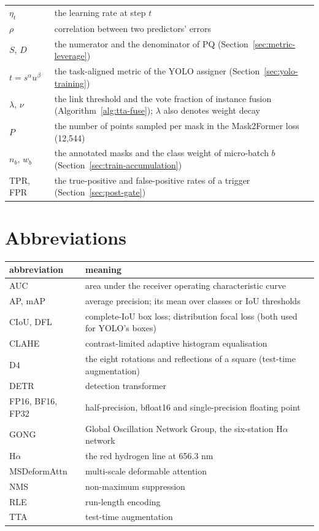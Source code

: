 {\begin{longtable}{@{}p{3.0cm}p{9.3cm}@{}}
$\eta_t$ & the learning rate at step $t$ \\
$\rho$ & correlation between two predictors' errors \\
$S$, $D$ & the numerator and the denominator of PQ (Section~\ref{sec:metric-leverage}) \\
$t=s^{\alpha}u^{\beta}$ & the task-aligned metric of the YOLO assigner (Section~\ref{sec:yolo-training}) \\
$\lambda$, $\nu$ & the link threshold and the vote fraction of instance fusion (Algorithm~\ref{alg:tta-fuse}); $\lambda$ also denotes weight decay \\
$P$ & the number of points sampled per mask in the Mask2Former loss (12,544) \\
$n_b$, $w_b$ & the annotated masks and the class weight of micro-batch $b$ (Section~\ref{sec:train-accumulation}) \\
TPR, FPR & the true-positive and false-positive rates of a trigger (Section~\ref{sec:post-gate}) \\
\end{longtable}
}

\section{Abbreviations}
{\small
\begin{longtable}{@{}p{3.0cm}p{9.3cm}@{}}
\toprule
abbreviation & meaning \\
\midrule
\endfirsthead
\bottomrule
\endfoot
AUC & area under the receiver operating characteristic curve \\
AP, mAP & average precision; its mean over classes or IoU thresholds \\
CIoU, DFL & complete-IoU box loss; distribution focal loss (both used for YOLO's boxes) \\
CLAHE & contrast-limited adaptive histogram equalisation \\
D4 & the eight rotations and reflections of a square (test-time augmentation) \\
DETR & detection transformer \\
FP16, BF16, FP32 & half-precision, bfloat16 and single-precision floating point \\
GONG & Global Oscillation Network Group, the six-station H$\alpha$ network \\
H$\alpha$ & the red hydrogen line at 656.3 nm \\
MSDeformAttn & multi-scale deformable attention \\
NMS & non-maximum suppression \\
RLE & run-length encoding \\
TTA & test-time augmentation \\
\end{longtable}
}
